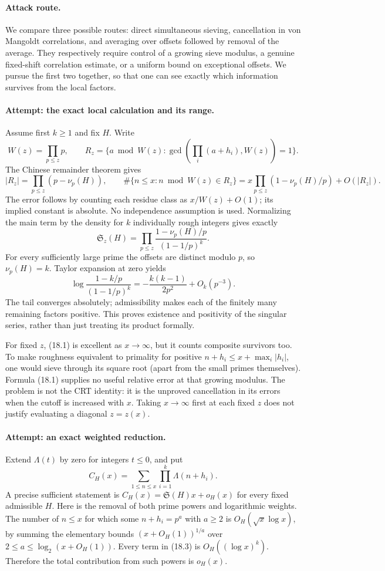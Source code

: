 \documentclass[11pt,a4paper]{article}
\begin{document}
\paragraph{Attack route.}
We compare three possible routes: direct simultaneous sieving, cancellation
in von Mangoldt correlations, and averaging over offsets followed by
removal of the average. They respectively require control of a growing
sieve modulus, a genuine fixed-shift correlation estimate, or a uniform
bound on exceptional offsets. We pursue the first two together, so that
one can see exactly which information survives from the local factors.

\paragraph{Attempt: the exact local calculation and its range.}
Assume first $k\geq1$ and fix $H$. Write
\[
 W(z)=\prod_{p\leq z}p,\qquad
 R_z=\{a\bmod W(z):\gcd(\prod_i(a+h_i),W(z))=1\}.
\]
The Chinese remainder theorem gives
\[
 |R_z|=\prod_{p\leq z}(p-\nu_p(H)),\qquad
 \#\{n\leq x:n\bmod W(z)\in R_z\}
 =x\prod_{p\leq z}(1-\nu_p(H)/p)+O(|R_z|).
 \tag{18.1}
\]
The error follows by counting each residue class as $x/W(z)+O(1)$;
its implied constant is absolute. No independence assumption is used.
Normalizing the main term by the density for $k$ individually rough
integers gives exactly
\[
 \mathfrak S_z(H)=
 \prod_{p\leq z}\frac{1-\nu_p(H)/p}{(1-1/p)^k}.
 \tag{18.2}
\]
For every sufficiently large prime the offsets are distinct modulo $p$,
so $\nu_p(H)=k$. Taylor expansion at zero yields
\[
 \log\frac{1-k/p}{(1-1/p)^k}
 =-\frac{k(k-1)}{2p^2}+O_k(p^{-3}).
\]
The tail converges absolutely; admissibility makes each of the finitely
many remaining factors positive. This proves existence and positivity of
the singular series, rather than just treating its product formally.

For fixed $z$, (18.1) is excellent as $x\to\infty$, but it counts composite
survivors too. To make roughness equivalent to primality for positive
$n+h_i\leq x+\max_i|h_i|$, one would sieve through its square root (apart
from the small primes themselves). Formula (18.1) supplies no useful
relative error at that growing modulus. The problem is not the CRT
identity: it is the unproved cancellation in its errors when the cutoff
is increased with $x$. Taking $x\to\infty$ first at each fixed $z$ does
not justify evaluating a diagonal $z=z(x)$.

\paragraph{Attempt: an exact weighted reduction.}
Extend $\Lambda(t)$ by zero for integers $t\leq0$, and put
\[
 C_H(x)=\sum_{1\leq n\leq x}\prod_{i=1}^k\Lambda(n+h_i).
 \tag{18.3}
\]
A precise sufficient statement is
$C_H(x)=\mathfrak S(H)x+o_H(x)$ for every fixed admissible $H$.
Here is the removal of both prime powers and logarithmic weights.
The number of $n\leq x$ for which some $n+h_i=p^a$ with $a\geq2$ is
$O_H(\sqrt{x}\log x)$, by summing the elementary bounds
$(x+O_H(1))^{1/a}$ over $2\leq a\leq\log_2(x+O_H(1))$.
Every term in (18.3) is $O_H((\log x)^k)$. Therefore the total contribution
from such powers is $o_H(x)$.
\end{document}
